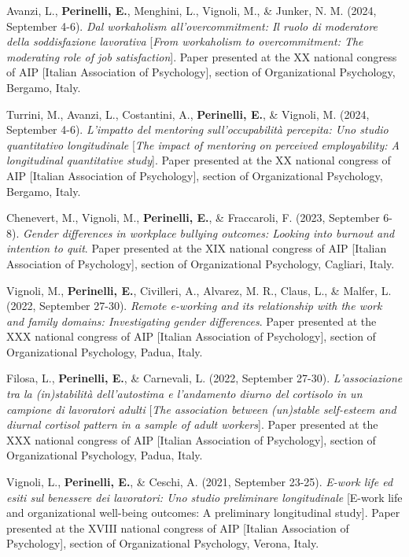 \documentclass[hidelinks, letterpaper,10pt]{article} %
\begin{document}
\begin{etaremune}
	\item Avanzi, L., \textbf{Perinelli, E.}, Menghini, L., Vignoli, M., \& Junker, N. M. (2024, September 4-6). \textit{Dal workaholism all’overcommitment: Il ruolo di moderatore della soddisfazione lavorativa} [\textit{From workaholism to overcommitment: The moderating role of job satisfaction}]. Paper presented at the XX national congress of AIP [Italian Association of Psychology], section of Organizational Psychology, Bergamo, Italy.

	\item Turrini, M., Avanzi, L., Costantini, A., \textbf{Perinelli, E.}, \& Vignoli, M. (2024, September 4-6). \textit{L'impatto del mentoring sull'occupabilità percepita: Uno studio quantitativo longitudinale} [\textit{The impact of mentoring on perceived employability: A longitudinal quantitative study}]. Paper presented at the XX national congress of AIP [Italian Association of Psychology], section of Organizational Psychology, Bergamo, Italy.

	\item Chenevert, M., Vignoli, M., \textbf{Perinelli, E.}, \& Fraccaroli, F. (2023, September 6-8). \textit{Gender differences in workplace bullying outcomes: Looking into burnout and intention to quit}. Paper presented at the XIX national congress of AIP [Italian Association of Psychology], section of Organizational Psychology, Cagliari, Italy.

	\item Vignoli, M., \textbf{Perinelli, E.}, Civilleri, A., Alvarez, M. R., Claus, L., \& Malfer, L. (2022, September 27-30). \textit{Remote e-working and its relationship with the work and family domains: Investigating gender differences}. Paper presented at the XXX national congress of AIP [Italian Association of Psychology], section of Organizational Psychology, Padua, Italy.

	\item Filosa, L., \textbf{Perinelli, E.}, \& Carnevali, L. (2022, September 27-30). \textit{L'associazione tra la (in)stabilità dell'autostima e l'andamento diurno del cortisolo in un campione di lavoratori adulti} [\textit{The association between (un)stable self-esteem and diurnal cortisol pattern in a sample of adult workers}]. Paper presented at the XXX national congress of AIP [Italian Association of Psychology], section of Organizational Psychology, Padua, Italy.
	
	\item Vignoli, L., \textbf{Perinelli, E.}, \& Ceschi, A. (2021, September 23-25). \textit{E-work life ed esiti sul benessere dei lavoratori: Uno studio preliminare longitudinale} [E-work life and organizational well-being outcomes: A preliminary longitudinal study]. Paper presented at the XVIII national congress of AIP [Italian Association of Psychology], section of Organizational Psychology, Verona, Italy.


\end{etaremune}
\end{document}
